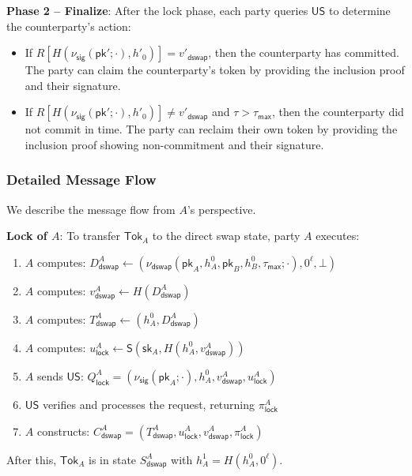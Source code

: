 \documentclass{article}
\newcommand{\sig}[0]{\mathsf{S}}
\newcommand{\pubkey}[0]{\mathsf{pk}}
\newcommand{\prikey}[0]{\mathsf{sk}}
\newcommand{\unisrv}[0]{\mathsf{US}}
\begin{document}
\noindent\textbf{Phase 2 -- Finalize}: After the lock phase, each party queries $\unisrv$ to determine the counterparty's action:
\begin{itemize}
\item If $R[H(\nu_\mathsf{sig}(\pubkey';\cdot), h'_0)] = v'_\mathsf{dswap}$, then the counterparty has committed. The party can claim the counterparty's token by providing the inclusion proof and their signature.
\item If $R[H(\nu_\mathsf{sig}(\pubkey';\cdot), h'_0)] \neq v'_\mathsf{dswap}$ and $\tau > \tau_\mathsf{max}$, then the counterparty did not commit in time. The party can reclaim their own token by providing the inclusion proof showing non-commitment and their signature.
\end{itemize}

\subsubsection{Detailed Message Flow}

We describe the message flow from $A$'s perspective.\medskip

\noindent\textbf{Lock of $A$}: To transfer $\mathsf{Tok}_A$ to the direct swap state, party $A$ executes:
\begin{enumerate}
\item $A$ computes: $D^A_\mathsf{dswap} \gets (\nu_\mathsf{dswap}(\pubkey_A, h^0_A, \pubkey_B, h^0_B, \tau_\mathsf{max};\cdot), 0^\ell, \bot)$
\item $A$ computes: $v^A_\mathsf{dswap} \gets H(D^A_\mathsf{dswap})$
\item $A$ computes: $T^A_\mathsf{dswap} \gets (h^0_A, D^A_\mathsf{dswap})$
\item $A$ computes: $u^A_\mathsf{lock} \gets \sig(\prikey_A, H(h^0_A, v^A_\mathsf{dswap}))$
\item $A$ sends $\unisrv$: $Q^A_\mathsf{lock} = (\nu_\mathsf{sig}(\pubkey_A;\cdot), h^0_A, v^A_\mathsf{dswap}, u^A_\mathsf{lock})$
\item $\unisrv$ verifies and processes the request, returning $\pi^A_\mathsf{lock}$
\item $A$ constructs: $C^A_\mathsf{dswap} = (T^A_\mathsf{dswap}, u^A_\mathsf{lock}, v^A_\mathsf{dswap}, \pi^A_\mathsf{lock})$
\end{enumerate}
After this, $\mathsf{Tok}_A$ is in state $S^A_\mathsf{dswap}$ with $h^1_A = H(h^0_A, 0^\ell)$.\medskip
\end{document}
